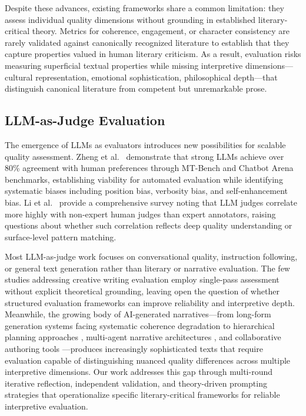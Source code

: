 Despite these advances, existing frameworks share a common limitation: they assess individual quality dimensions without grounding in established literary-critical theory. Metrics for coherence, engagement, or character consistency are rarely validated against canonically recognized literature to establish that they capture properties valued in human literary criticism. As a result, evaluation risks measuring superficial textual properties while missing interpretive dimensions---cultural representation, emotional sophistication, philosophical depth---that distinguish canonical literature from competent but unremarkable prose.

\subsection{LLM-as-Judge Evaluation}

The emergence of LLMs as evaluators introduces new possibilities for scalable quality assessment. Zheng et al.~\cite{zheng2023judging} demonstrate that strong LLMs achieve over 80\% agreement with human preferences through MT-Bench and Chatbot Arena benchmarks, establishing viability for automated evaluation while identifying systematic biases including position bias, verbosity bias, and self-enhancement bias. Li et al.~\cite{li2024llms} provide a comprehensive survey noting that LLM judges correlate more highly with non-expert human judges than expert annotators, raising questions about whether such correlation reflects deep quality understanding or surface-level pattern matching. %

Most LLM-as-judge work focuses on conversational quality, instruction following, or general text generation rather than literary or narrative evaluation. The few studies addressing creative writing evaluation employ single-pass assessment without explicit theoretical grounding, leaving open the question of whether structured evaluation frameworks can improve reliability and interpretive depth. Meanwhile, the growing body of AI-generated narratives---from long-form generation systems facing systematic coherence degradation \cite{wu2025longeval} to hierarchical planning approaches \cite{gu2025rapid,wan2025cognitive}, multi-agent narrative architectures \cite{huot2024agents,ran2025bookworld}, and collaborative authoring tools \cite{yuan2022wordcraft,mirowski2023co}---produces increasingly sophisticated texts that require evaluation capable of distinguishing nuanced quality differences across multiple interpretive dimensions. Our work addresses this gap through multi-round iterative reflection, independent validation, and theory-driven prompting strategies that operationalize specific literary-critical frameworks for reliable interpretive evaluation.
